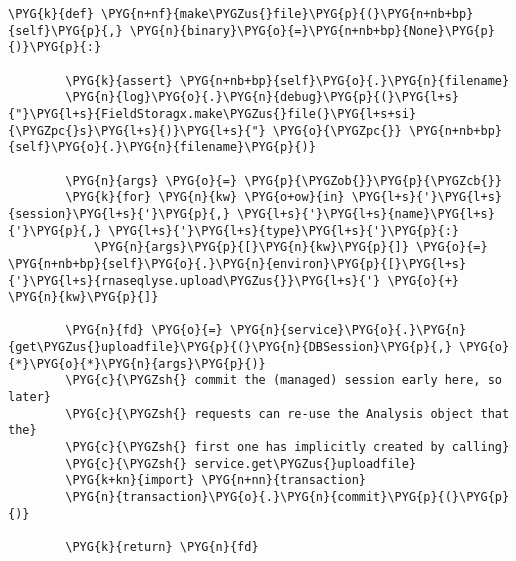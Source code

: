 \begin{Verbatim}[commandchars=\\\{\}]
    \PYG{k}{def} \PYG{n+nf}{make\PYGZus{}file}\PYG{p}{(}\PYG{n+nb+bp}{self}\PYG{p}{,} \PYG{n}{binary}\PYG{o}{=}\PYG{n+nb+bp}{None}\PYG{p}{)}\PYG{p}{:}

        \PYG{k}{assert} \PYG{n+nb+bp}{self}\PYG{o}{.}\PYG{n}{filename}
        \PYG{n}{log}\PYG{o}{.}\PYG{n}{debug}\PYG{p}{(}\PYG{l+s}{"}\PYG{l+s}{FieldStoragx.make\PYGZus{}file(}\PYG{l+s+si}{\PYGZpc{}s}\PYG{l+s}{)}\PYG{l+s}{"} \PYG{o}{\PYGZpc{}} \PYG{n+nb+bp}{self}\PYG{o}{.}\PYG{n}{filename}\PYG{p}{)}

        \PYG{n}{args} \PYG{o}{=} \PYG{p}{\PYGZob{}}\PYG{p}{\PYGZcb{}}
        \PYG{k}{for} \PYG{n}{kw} \PYG{o+ow}{in} \PYG{l+s}{'}\PYG{l+s}{session}\PYG{l+s}{'}\PYG{p}{,} \PYG{l+s}{'}\PYG{l+s}{name}\PYG{l+s}{'}\PYG{p}{,} \PYG{l+s}{'}\PYG{l+s}{type}\PYG{l+s}{'}\PYG{p}{:}
            \PYG{n}{args}\PYG{p}{[}\PYG{n}{kw}\PYG{p}{]} \PYG{o}{=} \PYG{n+nb+bp}{self}\PYG{o}{.}\PYG{n}{environ}\PYG{p}{[}\PYG{l+s}{'}\PYG{l+s}{rnaseqlyse.upload\PYGZus{}}\PYG{l+s}{'} \PYG{o}{+} \PYG{n}{kw}\PYG{p}{]}

        \PYG{n}{fd} \PYG{o}{=} \PYG{n}{service}\PYG{o}{.}\PYG{n}{get\PYGZus{}uploadfile}\PYG{p}{(}\PYG{n}{DBSession}\PYG{p}{,} \PYG{o}{*}\PYG{o}{*}\PYG{n}{args}\PYG{p}{)}
        \PYG{c}{\PYGZsh{} commit the (managed) session early here, so later}
        \PYG{c}{\PYGZsh{} requests can re-use the Analysis object that the}
        \PYG{c}{\PYGZsh{} first one has implicitly created by calling}
        \PYG{c}{\PYGZsh{} service.get\PYGZus{}uploadfile}
        \PYG{k+kn}{import} \PYG{n+nn}{transaction}
        \PYG{n}{transaction}\PYG{o}{.}\PYG{n}{commit}\PYG{p}{(}\PYG{p}{)}

        \PYG{k}{return} \PYG{n}{fd}
\end{Verbatim}


